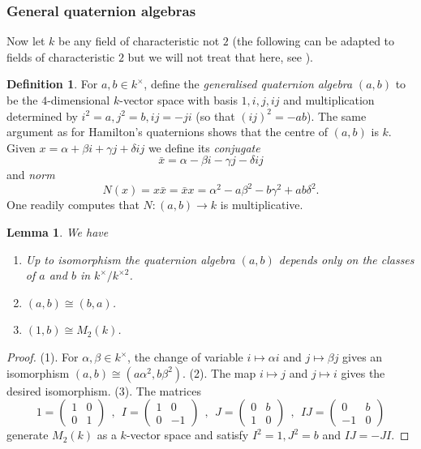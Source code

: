 \documentclass[11pt]{amsart}
\numberwithin{equation}{section}
\newtheorem{lemma}[equation]{Lemma}
\theoremstyle{remark}
\theoremstyle{remark}
\theoremstyle{remark}
\theoremstyle{definition}
\theoremstyle{definition}
\theoremstyle{definition}
\newtheorem{defi}[equation]{Definition}
\theoremstyle{definition}
\theoremstyle{definition}
\theoremstyle{definition}
\begin{document}
\subsubsection{General quaternion algebras}

Now let $k$ be any field of characteristic not $2$ (the following can be adapted to fields of characteristic $2$ but we will not treat that here, see \cite[Remark 1.18]{MR2266528}).

\begin{defi} \label{quaternion norm defi}
 For $a,b\in k^\times$, define the \textit{generalised quaternion algebra} $(a,b)$ to be the $4$-dimensional $k$-vector space with basis $1,i,j,ij$ and multiplication determined by $i^2=a,j^2=b, ij=-ji$ (so that $(ij)^2=-ab$). The same argument as for Hamilton's quaternions shows that the centre of $(a,b)$ is $k$.
Given $x=\alpha+\beta i+\gamma j+\delta ij$
we define its \textit{conjugate}
\[\bar{x}=\alpha-\beta i - \gamma j -\delta ij\]
and \textit{norm}
\[N(x)=x\bar{x}=\bar{x}x=\alpha^2-a \beta^2-b \gamma^2+ab \delta^2.\]
One readily computes that $N:(a,b)\rightarrow k$ is multiplicative. 
\end{defi}

\begin{lemma} \label{basic quaternion lemma}
We have
\begin{enumerate}
\item
Up to isomorphism the quaternion algebra $(a,b)$ depends only on the classes of $a$ and $b$ in $k^{\times}/k^{\times 2}$. 
\item $(a,b)\cong (b,a)$.
\item $(1,b) \cong M_2(k)$.
\end{enumerate}
\end{lemma}

\begin{proof}
(1). For $\alpha,\beta\in k^\times$, the change of variable $i\mapsto \alpha i$ and $j\mapsto \beta j$ gives an isomorphism $(a,b)\cong (a\alpha^2,b\beta^2)$. 
(2). The map $i\mapsto j$ and $j\mapsto  i$ gives the desired isomorphism. 
(3). The matrices 
\[
1=\left(\begin{array}{cc}
1 & 0\\
0 & 1
\end{array}\right)~~,~~ 
I=\left(\begin{array}{cc}
1 & 0\\
0 & -1
\end{array}\right)~~,~~J=\left(\begin{array}{cc}
0 & b\\
1 & 0
\end{array}\right)~~,~~IJ=\left(\begin{array}{cc}
0 & b\\
-1 & 0
\end{array}\right)
\]
generate $M_2(k)$ as a $k$-vector space and satisfy $I^2=1, J^2=b$ and $IJ=-JI$.
\end{proof}
\end{document}
